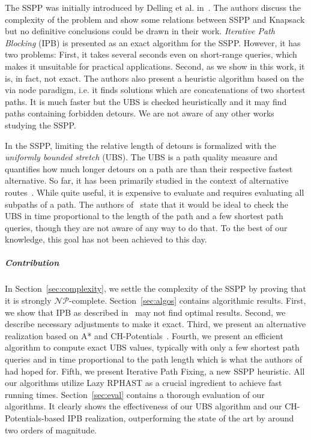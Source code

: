 \documentclass[a4paper,UKenglish,cleveref, autoref, thm-restate]{lipics-v2021}
\begin{document}
The SSPP was initially introduced by Delling et al. in~\cite{dss-tarrn-18}.
The authors discuss the complexity of the problem and show some relations between SSPP and Knapsack but no definitive conclusions could be drawn in their work.
\emph{Iterative Path Blocking} (IPB) is presented as an exact algorithm for the SSPP.
However, it has two problems:
First, it takes several seconds even on short-range queries, which makes it unsuitable for practical applications.
Second, as we show in this work, it is, in fact, not exact.
The authors also present a heuristic algorithm based on the via node paradigm, i.e. it finds solutions which are concatenations of two shortest paths.
It is much faster but the UBS is checked heuristically and it may find paths containing forbidden detours.
We are not aware of any other works studying the SSPP.

In the SSPP, limiting the relative length of detours is formalized with the \emph{uniformly bounded stretch} (UBS).
The UBS is a path quality measure and quantifies how much longer detours on a path are than their respective fastest alternative.
So far, it has been primarily studied in the context of alternative routes~\cite{adgw-arrn-13}.
While quite useful, it is expensive to evaluate and requires evaluating all subpaths of a path.
The authors of~\cite{adgw-arrn-13} state that it would be ideal to check the UBS in time proportional to the length of the path and a few shortest path queries, though they are not aware of any way to do that.
To the best of our knowledge, this goal has not been achieved to this day.

\subparagraph{Contribution}

In Section~\ref{sec:complexity}, we settle the complexity of the SSPP by proving that it is strongly $\mathcal{NP}$-complete.
Section~\ref{sec:algos} contains algorithmic results.
First, we show that IPB as described in~\cite{dss-tarrn-18} may not find optimal results.
Second, we describe necessary adjustments to make it exact.
Third, we present an alternative realization based on A* and CH-Potentials~\cite{strasser_et_al:LIPIcs.SEA.2021.6}.
Fourth, we present an efficient algorithm to compute exact UBS values, typically with only a few shortest path queries and in time proportional to the path length which is what the authors of~\cite{adgw-arrn-13} had hoped for.
Fifth, we present Iterative Path Fixing, a new SSPP heuristic.
All our algorithms utilize Lazy RPHAST as a crucial ingredient to achieve fast running times.
Section~\ref{sec:eval} contains a thorough evaluation of our algorithms.
It clearly shows the effectiveness of our UBS algorithm and our CH-Potentials-based IPB realization, outperforming the state of the art by around two orders of magnitude.
\end{document}
